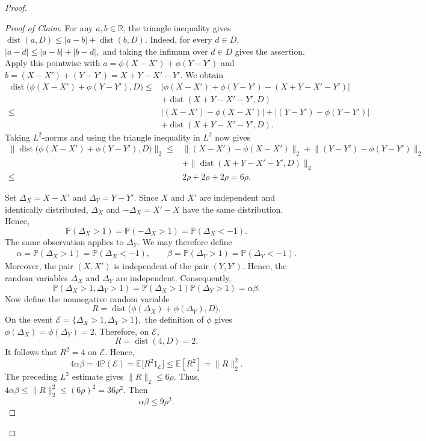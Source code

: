 \documentclass[11pt]{article}
\numberwithin{equation}{section}
\theoremstyle{definition}
\theoremstyle{remark}
\begin{document}
\begin{proof}
\begin{proof}[Proof of Claim]
For any $a,b\in\mathbb R$, the triangle inequality gives
$
\operatorname{dist}(a,D)
\leq |a-b|+\operatorname{dist}(b,D).
$
Indeed, for every $d\in D$,
$
|a-d|\leq|a-b|+|b-d|,
$
and taking the infimum over $d\in D$ gives the assertion.
Apply this pointwise with
$
a=\phi(X-X')+\phi(Y-Y')
$
and
$
b=(X-X')+(Y-Y')=X+Y-X'-Y'.
$
We obtain
$$
\begin{aligned}
\operatorname{dist}\bigl(
\phi(X-X')+\phi(Y-Y'),D
\bigr)
\leq&
\left|
\phi(X-X')+\phi(Y-Y')
-(X+Y-X'-Y')
\right|\\
&+
\operatorname{dist}(X+Y-X'-Y',D)\\
\leq&
\bigl|(X-X')-\phi(X-X')\bigr|
+\bigl|(Y-Y')-\phi(Y-Y')\bigr|\\
&+
\operatorname{dist}(X+Y-X'-Y',D).
\end{aligned}
$$
Taking $L^2$-norms and using the triangle inequality in $L^2$ now
gives
$$
\begin{aligned}
\bigl\|\operatorname{dist}\bigl(
\phi(X-X')+\phi(Y-Y'),D
\bigr)\bigr\|_2
\leq&
\bigl\|(X-X')-\phi(X-X')\bigr\|_2
+\bigl\|(Y-Y')-\phi(Y-Y')\bigr\|_2\\
&+
\bigl\|\operatorname{dist}
(X+Y-X'-Y',D)\bigr\|_2\\
\leq&2\rho+2\rho+2\rho
=6\rho.
\end{aligned}
$$

Set
$
\Delta_X=X-X'$
and
$
\Delta_Y=Y-Y'.
$
Since $X$ and $X'$ are independent and identically distributed,
$\Delta_X$ and $-\Delta_X=X'-X$ have the same distribution. Hence,
$$
\mathbb P(\Delta_X>1)
=\mathbb P(-\Delta_X>1)
=\mathbb P(\Delta_X<-1).
$$
The same observation applies to $\Delta_Y$. We may therefore define
$$
\begin{aligned}
\alpha
=\mathbb P(\Delta_X>1)
 =\mathbb P(\Delta_X<-1),\qquad
\beta=\mathbb P(\Delta_Y>1)
 =\mathbb P(\Delta_Y<-1).
\end{aligned}
$$
Moreover, the pair $(X,X')$ is independent of the pair $(Y,Y')$.
Hence, the random variables $\Delta_X$ and $\Delta_Y$
are independent. Consequently,
$$
\mathbb P(\Delta_X>1,\Delta_Y>1)
=
\mathbb P(\Delta_X>1)\mathbb P(\Delta_Y>1)
=\alpha\beta.
$$
Now define the nonnegative random variable
$$
R=\operatorname{dist}\bigl(
\phi(\Delta_X)+\phi(\Delta_Y),D
\bigr).
$$
On the event
$
\mathcal E=\{\Delta_X>1,\Delta_Y>1\},
$
the definition of $\phi$ gives
$
\phi(\Delta_X)=\phi(\Delta_Y)=2.
$
Therefore, on $\mathcal E$,
$$
R=\operatorname{dist}(4,D)=2.
$$
It follows that
$
R^2=4
$
on $\mathcal E$.
Hence,
$$
4\alpha\beta=4\mathbb P(\mathcal E)
=\mathbb E\bigl[R^2 1_{\mathcal E}\bigr]
\leq\mathbb E[R^2]=\|R\|_2^2.
$$
The preceding $L^2$ estimate gives $\|R\|_2\leq6\rho$. Thus,
$
4\alpha\beta
\leq\|R\|_2^2
\leq(6\rho)^2
=36\rho^2.
$
Then
$$
\alpha\beta\leq9\rho^2.
$$



\end{proof}
\end{proof}
\end{document}
